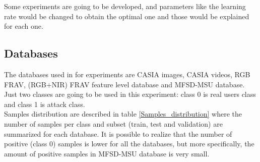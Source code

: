 Some experiments are going to be developed, and parameters like the learning rate would be changed to obtain the optimal one and those would be explained for each one.

\subsection{Databases} \label{subssec:ejec1_database}
The databases used in for experiments are CASIA images, CASIA videos, RGB FRAV, (RGB+NIR) FRAV feature level database and MFSD-MSU database. Just two classes are going to be used in this experiment: class 0 is real users class and class 1 is attack class.\\

Samples distribution are described in table \ref{Samples_distribution} where the number of samples per class and  subset (train, test and validation) are summarized for each database. It is possible to realize that the number of positive (class 0) samples is lower for all the databases, but more specifically, the amount of positive samples in MFSD-MSU database is very small.\\

